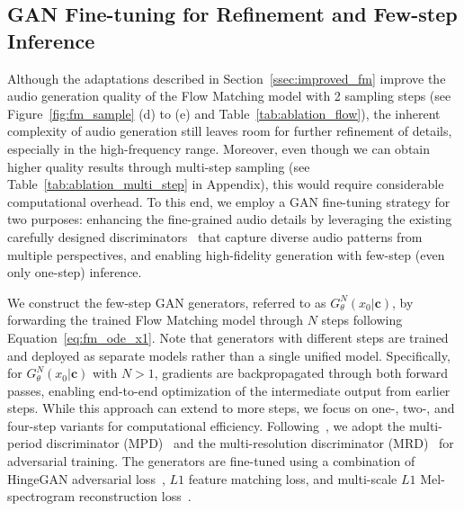 \subsection{GAN Fine-tuning for Refinement and Few-step Inference}
\label{ssec:gan_ft}

Although the adaptations described in Section~\ref{ssec:improved_fm} improve the audio generation quality of the Flow Matching model with 2 sampling steps (see Figure~\ref{fig:fm_sample} (d) to (e) and Table~\ref{tab:ablation_flow}), the inherent complexity of audio generation still leaves room for further refinement of details, especially in the high-frequency range. 
Moreover, even though we can obtain higher quality results through multi-step sampling (see Table~\ref{tab:ablation_multi_step} in Appendix), this would require considerable computational overhead. To this end, we employ a GAN fine-tuning strategy for two purposes: enhancing the fine-grained audio details by leveraging the existing carefully designed discriminators~\citep{hifigan, mrd} that capture diverse audio patterns from multiple perspectives, and enabling high-fidelity generation with few-step (even only one-step) inference. 

We construct the few-step GAN generators, referred to as $G_{\theta}^N(x_0|\mathbf{c})$, by forwarding the trained Flow Matching model through $N$ steps following Equation~\ref{eq:fm_ode_x1}. 
Note that generators with different steps are trained and deployed as separate models rather than a single unified model.
Specifically, for $G_{\theta}^N(x_0|\mathbf{c})$ with $N>1$, gradients are backpropagated through both forward passes, enabling end-to-end optimization of the intermediate output from earlier steps. While this approach can extend to more steps, we focus on one-, two-, and four-step variants for computational efficiency. Following~\citep{vocos}, we adopt the multi-period discriminator (MPD)~\citep{hifigan} and the multi-resolution discriminator (MRD)~\citep{mrd} for adversarial training. The generators are fine-tuned using a combination of HingeGAN adversarial loss~\citep{hingegan}, $L1$ feature matching loss, and multi-scale $L1$ Mel-spectrogram reconstruction loss~\citep{dac}. 

